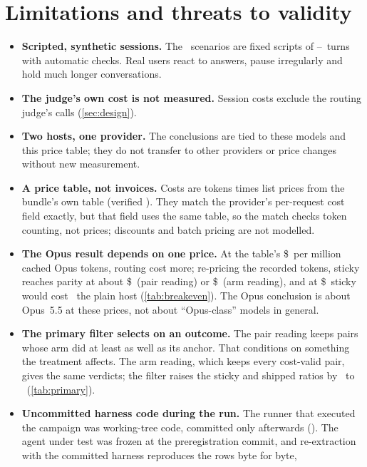 \section{Limitations and threats to validity}\label{sec:limits}

\begin{itemize}
  \item \textbf{Scripted, synthetic sessions.} The \NScenarios\ scenarios are fixed scripts of
    \MinTurns--\MaxTurns\ turns with automatic checks. Real users react to answers, pause irregularly and
    hold much longer conversations.
  \item \textbf{The judge's own cost is not measured.} Session costs exclude the routing judge's calls
    (\cref{sec:design}).
  \item \textbf{Two hosts, one provider.} The conclusions are tied to these models and this price table;
    they do not transfer to other providers or price changes without new measurement.
  \item \textbf{A price table, not invoices.} Costs are tokens times list prices from the bundle's own table
    (verified \RatesVerified). They match the provider's per-request cost field exactly, but that field uses
    the same table, so the match checks token counting, not prices; discounts and batch pricing are not
    modelled.
  \item \textbf{The Opus result depends on one price.} At the table's \$\PriceOpusRead\ per million cached
    Opus tokens, routing cost more; re-pricing the recorded tokens, sticky reaches parity at about
    \$\BEStickyPair\ (pair reading) or \$\BEStickyArm\ (arm reading), and at \$\RateForty\ sticky would cost
    \BEStickyForty\X\ the plain host (\cref{tab:breakeven}). The Opus conclusion is about Opus~5.5 at these
    prices, not about ``Opus-class'' models in general.
  \item \textbf{The primary filter selects on an outcome.} The pair reading keeps pairs whose arm did at
    least as well as its anchor. That conditions on something the treatment affects. The arm reading, which
    keeps every cost-valid pair, gives the same verdicts; the filter raises the sticky and shipped ratios by
    \FilterLiftLow\ to \FilterLiftHigh\ (\cref{tab:primary}).
  \item \textbf{Uncommitted harness code during the run.} The runner that executed the campaign was
    working-tree code, committed only afterwards (\code{\HarnessSha}). The agent under test was frozen at the
    preregistration commit, and re-extraction with the committed harness reproduces the rows byte for byte,

\end{itemize}
